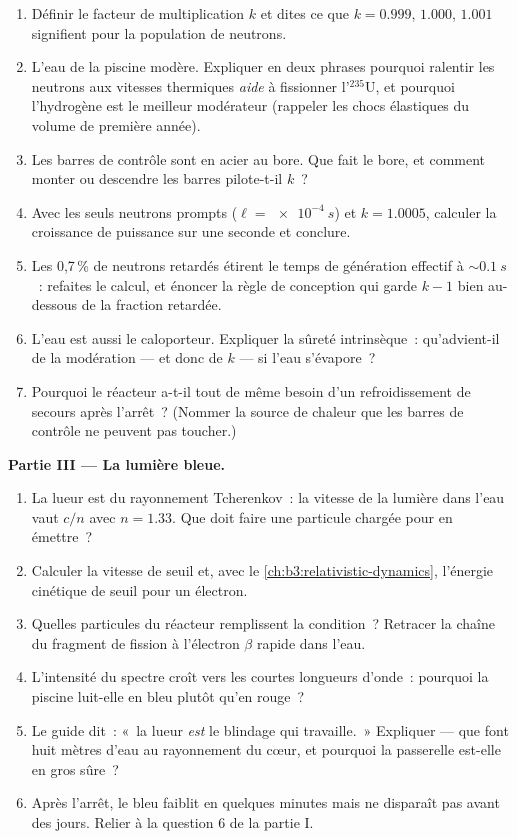 \begin{problem}
\begin{enumerate}[resume]
  \item Définir le facteur de multiplication $k$ et dites ce que
        $k = 0.999$, $1.000$, $1.001$ signifient pour la population
        de neutrons.
  \item L'eau de la piscine modère. Expliquer en deux phrases
        pourquoi ralentir les neutrons aux vitesses thermiques
        \emph{aide} à fissionner l'$^{235}$U, et pourquoi
        l'hydrogène est le meilleur modérateur (rappeler les
        chocs élastiques du volume de première année).
  \item Les barres de contrôle sont en acier au bore. Que fait le
        bore, et comment monter ou descendre les barres pilote-t-il
        $k$~?
  \item Avec les seuls neutrons prompts ($\ell = \qty{e-4}{s}$) et
        $k = 1.0005$, calculer la croissance de puissance sur une
        seconde et conclure.
  \item Les 0,7\,\% de neutrons retardés étirent le temps de
        génération effectif à $\sim\qty{0.1}{s}$~: refaites le
        calcul, et énoncer la règle de conception qui garde $k - 1$
        bien au-dessous de la fraction retardée.
  \item L'eau est aussi le caloporteur. Expliquer la sûreté
        intrinsèque~: qu'advient-il de la modération --- et donc de
        $k$ --- si l'eau s'évapore~?
  \item Pourquoi le réacteur a-t-il tout de même besoin d'un
        refroidissement de secours après l'arrêt~? (Nommer la source
        de chaleur que les barres de contrôle ne peuvent pas
        toucher.)
\end{enumerate}

\medskip\noindent\textbf{Partie III --- La lumière bleue.}

\begin{enumerate}[resume]
  \item La lueur est du rayonnement Tcherenkov~: la vitesse de la
        lumière dans l'eau vaut $c/n$ avec $n = 1.33$. Que doit faire
        une particule chargée pour en émettre~?
  \item Calculer la vitesse de seuil et, avec le
        \cref{ch:b3:relativistic-dynamics}, l'énergie cinétique de
        seuil pour un électron.
  \item Quelles particules du réacteur remplissent la condition~?
        Retracer la chaîne du fragment de fission à l'électron
        $\beta$ rapide dans l'eau.
  \item L'intensité du spectre croît vers les courtes longueurs
        d'onde~: pourquoi la piscine luit-elle en bleu plutôt qu'en
        rouge~?
  \item Le guide dit~: «~la lueur \emph{est} le blindage qui
        travaille.~» Expliquer --- que font huit mètres d'eau au
        rayonnement du cœur, et pourquoi la passerelle est-elle en
        gros sûre~?
  \item Après l'arrêt, le bleu faiblit en quelques minutes mais ne
        disparaît pas avant des jours. Relier à la question 6 de la
        partie I.
\end{enumerate}


\end{problem}
